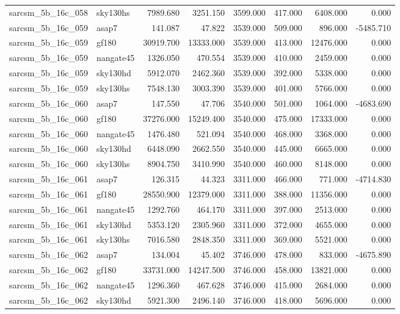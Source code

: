 \begin{tabular}{llrrrrrr}
sarcsm\_5b\_16c\_058 & sky130hs & 7989.680 & 3251.150 & 3599.000 & 417.000 & 6408.000 & 0.000 \\
sarcsm\_5b\_16c\_059 & asap7 & 141.087 & 47.822 & 3539.000 & 509.000 & 896.000 & -5485.710 \\
sarcsm\_5b\_16c\_059 & gf180 & 30919.700 & 13333.000 & 3539.000 & 413.000 & 12476.000 & 0.000 \\
sarcsm\_5b\_16c\_059 & nangate45 & 1326.050 & 470.554 & 3539.000 & 410.000 & 2459.000 & 0.000 \\
sarcsm\_5b\_16c\_059 & sky130hd & 5912.070 & 2462.360 & 3539.000 & 392.000 & 5338.000 & 0.000 \\
sarcsm\_5b\_16c\_059 & sky130hs & 7548.130 & 3003.390 & 3539.000 & 401.000 & 5766.000 & 0.000 \\
sarcsm\_5b\_16c\_060 & asap7 & 147.550 & 47.706 & 3540.000 & 501.000 & 1064.000 & -4683.690 \\
sarcsm\_5b\_16c\_060 & gf180 & 37276.000 & 15249.400 & 3540.000 & 475.000 & 17333.000 & 0.000 \\
sarcsm\_5b\_16c\_060 & nangate45 & 1476.480 & 521.094 & 3540.000 & 468.000 & 3368.000 & 0.000 \\
sarcsm\_5b\_16c\_060 & sky130hd & 6448.090 & 2662.550 & 3540.000 & 445.000 & 6665.000 & 0.000 \\
sarcsm\_5b\_16c\_060 & sky130hs & 8904.750 & 3410.990 & 3540.000 & 460.000 & 8148.000 & 0.000 \\
sarcsm\_5b\_16c\_061 & asap7 & 126.315 & 44.323 & 3311.000 & 466.000 & 771.000 & -4714.830 \\
sarcsm\_5b\_16c\_061 & gf180 & 28550.900 & 12379.000 & 3311.000 & 388.000 & 11356.000 & 0.000 \\
sarcsm\_5b\_16c\_061 & nangate45 & 1292.760 & 464.170 & 3311.000 & 397.000 & 2513.000 & 0.000 \\
sarcsm\_5b\_16c\_061 & sky130hd & 5353.120 & 2305.960 & 3311.000 & 372.000 & 4655.000 & 0.000 \\
sarcsm\_5b\_16c\_061 & sky130hs & 7016.580 & 2848.350 & 3311.000 & 369.000 & 5521.000 & 0.000 \\
sarcsm\_5b\_16c\_062 & asap7 & 134.004 & 45.402 & 3746.000 & 478.000 & 833.000 & -4675.890 \\
sarcsm\_5b\_16c\_062 & gf180 & 33731.000 & 14247.500 & 3746.000 & 458.000 & 13821.000 & 0.000 \\
sarcsm\_5b\_16c\_062 & nangate45 & 1296.360 & 467.628 & 3746.000 & 415.000 & 2684.000 & 0.000 \\
sarcsm\_5b\_16c\_062 & sky130hd & 5921.300 & 2496.140 & 3746.000 & 418.000 & 5696.000 & 0.000 \\

\end{tabular}
